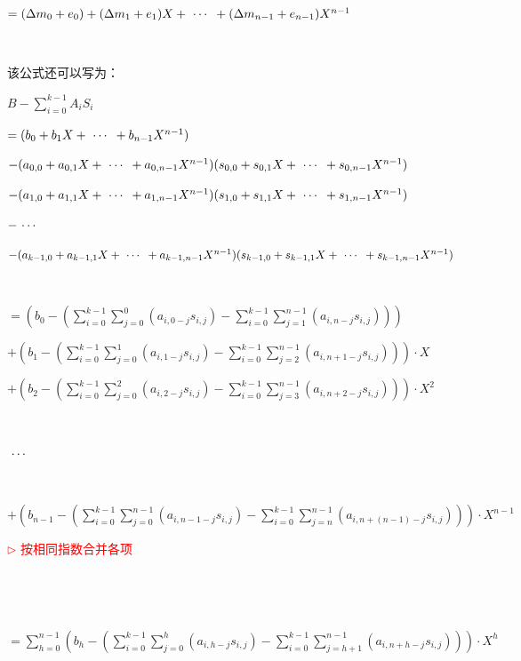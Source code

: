 $= (\Delta m_0 + e_0) + (\Delta m_1 + e_1)X + \text{ } \text{$\cdots$} \text{ } + (\Delta m_{n-1} + e_{n-1})X^{n-1}$

$ $

\noindent 该公式还可以写为：

$B - \sum\limits_{i=0}^{k-1}A_iS_i$ 

$ = (b_0 + b_1X + \text{ } \text{$\cdots$} \text{ } + b_{n-1}X^{n-1} )$ 

$ - (a_{0,0} + a_{0,1}X + \text{ } \text{$\cdots$} \text{ } + a_{0, n-1}X^{n-1})(s_{0,0} + s_{0,1}X + \text{ } \text{$\cdots$} \text{ } + s_{0, n-1}X^{n-1})$ 

$ - (a_{1,0} + a_{1,1}X + \text{ } \text{$\cdots$} \text{ } + a_{1, n-1}X^{n-1})(s_{1,0} + s_{1,1}X + \text{ } \text{$\cdots$} \text{ } + s_{1, n-1}X^{n-1})$

$ - \text{ } \text{$\cdots$} \text{ } $ 

$ - (a_{k-1,0} + a_{k-1,1}X + \text{ } \text{$\cdots$} \text{ } + a_{k-1, n-1}X^{n-1})(s_{k-1,0} + s_{k-1,1}X + \text{ } \text{$\cdots$} \text{ } + s_{k-1, n-1}X^{n-1})$ 

$ $

$ = \left(b_0 - \left( \sum\limits_{i=0}^{k-1} \sum\limits_{j=0}^{0}(a_{i,0-j}s_{i,j}) - \sum\limits_{i=0}^{k-1} \sum\limits_{j=1}^{n-1}(a_{i,n-j}s_{i,j}) \right)\right)$

$ + \left(b_1 - \left( \sum\limits_{i=0}^{k-1} \sum\limits_{j=0}^{1}(a_{i,1-j}s_{i,j}) - \sum\limits_{i=0}^{k-1} \sum\limits_{j=2}^{n-1}(a_{i,n+1-j}s_{i,j})   \right) \right)\cdot X$ 



$ + \left(b_2 - \left( \sum\limits_{i=0}^{k-1} \sum\limits_{j=0}^{2}(a_{i,2-j}s_{i,j}) - \sum\limits_{i=0}^{k-1} \sum\limits_{j=3}^{n-1}(a_{i,n+2-j}s_{i,j})   \right) \right)\cdot X^2$ 

$ $

$\text{ } \text{$\cdots$} \text{ }$ 

$ $

$ + \left(b_{n-1} - \left(  \sum\limits_{i=0}^{k-1} \sum\limits_{j=0}^{n-1}(a_{i,n-1-j}s_{i,j}) - \sum\limits_{i=0}^{k-1} \sum\limits_{j=n}^{n-1}(a_{i,n+(n-1)-j}s_{i,j})  \right) \right)\cdot X^{n-1}$ 

\textcolor{red}{ $\rhd$ 按相同指数合并各项}

$ $


$ $

$= \sum\limits_{h=0}^{n-1}  \left(b_h - \left(  \sum\limits_{i=0}^{k-1} \sum\limits_{j=0}^{h}(a_{i,h-j}s_{i,j}) - \sum\limits_{i=0}^{k-1} \sum\limits_{j=h+1}^{n-1}(a_{i,n+h-j}s_{i,j})  \right) \right)\cdot X^{h}  $


$ $


